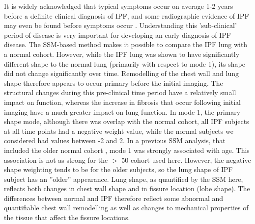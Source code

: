 It is widely acknowledged that typical symptoms occur on average 1-2 years before a definite clinical diagnosis of IPF, and some radiographic evidence of IPF may even be found before symptoms occur \citep{raghu2011official, devaraj2014imaging}. Understanding this 'sub-clinical' period of disease is very important for developing an early diagnosis of IPF disease. The SSM-based method makes it possible to compare the IPF lung with a normal cohort. However, while the IPF lung was shown to have significantly different shape to the normal lung (primarily with respect to mode 1), its shape did not change significantly over time. Remodelling of the chest wall and lung shape therefore appears to occur primary before the initial imaging. The structural changes during this pre-clinical time period have a relatively small impact on function, whereas the increase in fibrosis that occur following initial imaging have a much greater impact on lung function. In mode 1, the primary shape mode, although there was overlap with the normal cohort, all IPF subjects at all time points had a negative weight value, while the normal subjects we considered had values between -2 and 2. In a previous SSM analysis, that included the older normal cohort \citep{Osanlouy2018Statistical}, mode 1 was strongly associated with age. This association is not as strong for the $>$ 50 cohort used here. However, the negative shape weighting tends to be for the older subjects, so the lung shape of IPF subject has an ''older'' appearance. Lung shape, as quantified by the SSM here, reflects both changes in chest wall shape and in fissure location (lobe shape). The differences between normal and IPF therefore reflect some abnormal and quantifiable chest wall remodelling as well as changes to mechanical properties of the tissue that affect the fissure locations.


